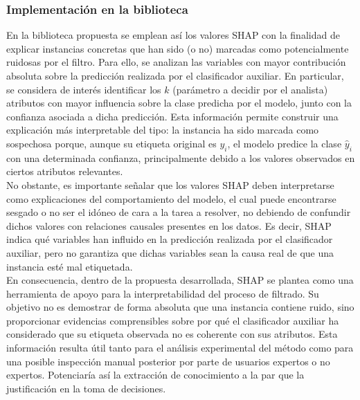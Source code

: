 \documentclass[print, color]{ugrTFG}
\begin{document}
 
 \subsubsection{Implementación en la biblioteca}
    En la biblioteca propuesta se emplean así los valores SHAP con la finalidad de  explicar instancias concretas que han sido (o no) marcadas como potencialmente ruidosas por el filtro. Para ello, se analizan las variables con mayor contribución absoluta sobre la predicción realizada por el clasificador auxiliar. En particular, se considera de interés identificar los $k$ (parámetro a decidir por el analista) atributos con mayor influencia sobre la clase predicha por el modelo, junto con la confianza asociada a dicha predicción. Esta información permite construir una explicación más interpretable del tipo: la instancia ha sido marcada como sospechosa porque, aunque su etiqueta original es $y_i$, el modelo predice la clase $\hat{y}_i$ con una determinada confianza, principalmente debido a los valores observados en ciertos atributos relevantes.\\
    
    No obstante, es importante señalar que los valores SHAP deben interpretarse como explicaciones del comportamiento del modelo, el cual puede encontrarse sesgado o no ser el idóneo de cara a la tarea a resolver, no debiendo de confundir dichos valores con relaciones causales presentes en los datos. Es decir, SHAP indica qué variables han influido en la predicción realizada por el clasificador auxiliar, pero no garantiza que dichas variables sean la causa real de que una instancia esté mal etiquetada.\\
    
    En consecuencia, dentro de la propuesta desarrollada, SHAP se plantea como una herramienta de apoyo para la interpretabilidad del proceso de filtrado. Su objetivo no es demostrar de forma absoluta que una instancia contiene ruido, sino proporcionar evidencias comprensibles sobre por qué el clasificador auxiliar ha considerado que su etiqueta observada no es coherente con sus atributos. Esta información resulta útil tanto para el análisis experimental del método como para una posible inspección manual posterior por parte de usuarios expertos o no expertos. Potenciaría así la extracción de conocimiento a la par que la justificación en la toma de decisiones. \\
    
\end{document}
